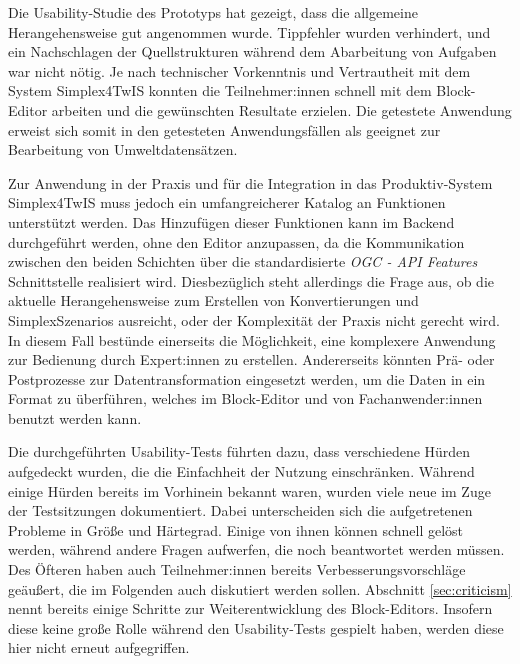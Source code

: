 \newcommand{\qref}[2]{(Vgl. \hyperref[#2]{\ref*{sec:qualitative}, \textbf{#1}})}

Die Usability-Studie des Prototyps hat gezeigt, dass die allgemeine Herangehensweise gut angenommen wurde. Tippfehler wurden verhindert, und ein Nachschlagen der Quellstrukturen während dem Abarbeitung von Aufgaben war nicht nötig. Je nach technischer Vorkenntnis und Vertrautheit mit dem System Simplex4TwIS konnten die Teilnehmer:innen schnell mit dem Block-Editor arbeiten und die gewünschten Resultate erzielen. Die getestete Anwendung erweist sich somit in den getesteten Anwendungsfällen als geeignet zur Bearbeitung von Umweltdatensätzen.

Zur Anwendung in der Praxis und für die Integration in das Produktiv-System Simplex4TwIS muss jedoch ein umfangreicherer Katalog an Funktionen unterstützt werden. Das Hinzufügen dieser Funktionen kann im Backend durchgeführt werden, ohne den Editor anzupassen, da die Kommunikation zwischen den beiden Schichten über die standardisierte \textit{OGC - API Features} Schnittstelle realisiert wird. Diesbezüglich steht allerdings die Frage aus, ob die aktuelle Herangehensweise zum Erstellen von Konvertierungen und SimplexSzenarios ausreicht, oder der Komplexität der Praxis nicht gerecht wird. In diesem Fall bestünde einerseits die Möglichkeit, eine komplexere Anwendung zur Bedienung durch Expert:innen zu erstellen. Andererseits könnten Prä- oder Postprozesse zur Datentransformation eingesetzt werden, um die Daten in ein Format zu überführen, welches im Block-Editor und von Fachanwender:innen benutzt werden kann.

Die durchgeführten Usability-Tests führten dazu, dass verschiedene Hürden aufgedeckt wurden, die die Einfachheit der Nutzung einschränken. Während einige Hürden bereits im Vorhinein bekannt waren, wurden viele neue im Zuge der Testsitzungen dokumentiert. Dabei unterscheiden sich die aufgetretenen Probleme in Größe und Härtegrad. Einige von ihnen können schnell gelöst werden, während andere Fragen aufwerfen, die noch beantwortet werden müssen. Des Öfteren haben auch Teilnehmer:innen bereits Verbesserungsvorschläge geäußert, die im Folgenden auch diskutiert werden sollen. Abschnitt \ref{sec:criticism} nennt bereits einige Schritte zur Weiterentwicklung des Block-Editors. Insofern diese keine große Rolle während den Usability-Tests gespielt haben, werden diese hier nicht erneut aufgegriffen.


